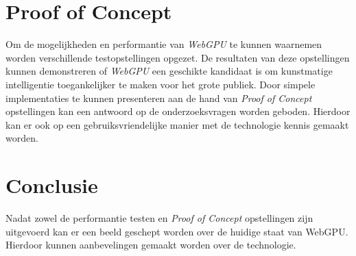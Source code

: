\section{Proof of Concept}

Om de mogelijkheden en performantie van \textit{WebGPU} te kunnen waarnemen worden verschillende testopstellingen opgezet. De resultaten van deze opstellingen kunnen demonstreren of \textit{WebGPU} een geschikte kandidaat is om kunstmatige intelligentie toegankelijker te maken voor het grote publiek. Door simpele implementaties te kunnen presenteren aan de hand van \textit{Proof of Concept} opstellingen kan een antwoord op de onderzoeksvragen worden geboden. Hierdoor kan er ook op een gebruiksvriendelijke manier met de technologie kennis gemaakt worden.

\section{Conclusie}

Nadat zowel de performantie testen en \textit{Proof of Concept} opstellingen zijn uitgevoerd kan er een beeld geschept worden over de huidige staat van WebGPU. Hierdoor kunnen aanbevelingen gemaakt worden over de technologie.
